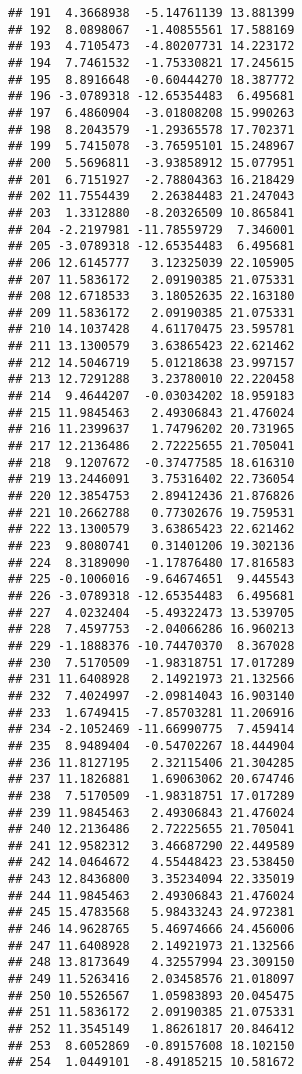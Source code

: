 \documentclass[]{article}
\begin{document}
\begin{verbatim}
## 191  4.3668938  -5.14761139 13.881399
## 192  8.0898067  -1.40855561 17.588169
## 193  4.7105473  -4.80207731 14.223172
## 194  7.7461532  -1.75330821 17.245615
## 195  8.8916648  -0.60444270 18.387772
## 196 -3.0789318 -12.65354483  6.495681
## 197  6.4860904  -3.01808208 15.990263
## 198  8.2043579  -1.29365578 17.702371
## 199  5.7415078  -3.76595101 15.248967
## 200  5.5696811  -3.93858912 15.077951
## 201  6.7151927  -2.78804363 16.218429
## 202 11.7554439   2.26384483 21.247043
## 203  1.3312880  -8.20326509 10.865841
## 204 -2.2197981 -11.78559729  7.346001
## 205 -3.0789318 -12.65354483  6.495681
## 206 12.6145777   3.12325039 22.105905
## 207 11.5836172   2.09190385 21.075331
## 208 12.6718533   3.18052635 22.163180
## 209 11.5836172   2.09190385 21.075331
## 210 14.1037428   4.61170475 23.595781
## 211 13.1300579   3.63865423 22.621462
## 212 14.5046719   5.01218638 23.997157
## 213 12.7291288   3.23780010 22.220458
## 214  9.4644207  -0.03034202 18.959183
## 215 11.9845463   2.49306843 21.476024
## 216 11.2399637   1.74796202 20.731965
## 217 12.2136486   2.72225655 21.705041
## 218  9.1207672  -0.37477585 18.616310
## 219 13.2446091   3.75316402 22.736054
## 220 12.3854753   2.89412436 21.876826
## 221 10.2662788   0.77302676 19.759531
## 222 13.1300579   3.63865423 22.621462
## 223  9.8080741   0.31401206 19.302136
## 224  8.3189090  -1.17876480 17.816583
## 225 -0.1006016  -9.64674651  9.445543
## 226 -3.0789318 -12.65354483  6.495681
## 227  4.0232404  -5.49322473 13.539705
## 228  7.4597753  -2.04066286 16.960213
## 229 -1.1888376 -10.74470370  8.367028
## 230  7.5170509  -1.98318751 17.017289
## 231 11.6408928   2.14921973 21.132566
## 232  7.4024997  -2.09814043 16.903140
## 233  1.6749415  -7.85703281 11.206916
## 234 -2.1052469 -11.66990775  7.459414
## 235  8.9489404  -0.54702267 18.444904
## 236 11.8127195   2.32115406 21.304285
## 237 11.1826881   1.69063062 20.674746
## 238  7.5170509  -1.98318751 17.017289
## 239 11.9845463   2.49306843 21.476024
## 240 12.2136486   2.72225655 21.705041
## 241 12.9582312   3.46687290 22.449589
## 242 14.0464672   4.55448423 23.538450
## 243 12.8436800   3.35234094 22.335019
## 244 11.9845463   2.49306843 21.476024
## 245 15.4783568   5.98433243 24.972381
## 246 14.9628765   5.46974666 24.456006
## 247 11.6408928   2.14921973 21.132566
## 248 13.8173649   4.32557994 23.309150
## 249 11.5263416   2.03458576 21.018097
## 250 10.5526567   1.05983893 20.045475
## 251 11.5836172   2.09190385 21.075331
## 252 11.3545149   1.86261817 20.846412
## 253  8.6052869  -0.89157608 18.102150
## 254  1.0449101  -8.49185215 10.581672

\end{verbatim}
\end{document}
